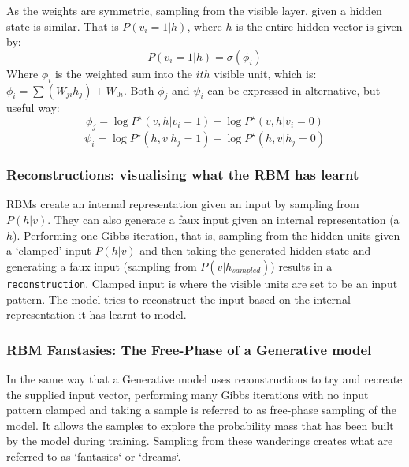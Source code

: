     As the weights are symmetric, sampling from the visible layer, given a hidden state is similar. That is $P(v_i = 1 | h)$, where $h$ is the entire hidden vector is given by:
    \begin{equation}\label{eq:Vis-Gibbs-Update}
     P(v_i = 1 | h) = \sigma(\phi_{i})
    \end{equation}
    Where $\phi_i$ is the weighted sum into the $ith$ visible unit, which is: $ \phi_i = \sum(W_{ji}h_{j}) + W_{0i} $. Both $\phi_j$ and $\psi_i$ can be expressed in alternative, but useful way:
    \begin{equation}
    \phi_j = \log P^\star(v,h | v_i = 1) - \log P^\star(v,h | v_i = 0)
    \end{equation}
    \begin{equation}\label{psi-gibbs-update-rbm}
    \psi_i = \log P^\star(h,v | h_j = 1) - \log P^\star(h,v | h_j = 0)
    \end{equation}



\subsubsection{Reconstructions: visualising what the RBM has learnt}\label{SS:RBM-Reconstructions}

RBMs create an internal representation given an input by sampling from $P(h|v)$. They can also generate a faux input given an internal representation (a $h$). Performing one Gibbs iteration, that is, sampling from the hidden units given a `clamped' input $ P(h|v) $ and then taking the generated hidden state and generating a faux input (sampling from $P(v|h_{sampled})$) results in a \texttt{reconstruction}. Clamped input is where the visible units are set to be an input pattern. The model tries to reconstruct the input based on the internal representation it has learnt to model.

\subsubsection{RBM Fanstasies: The Free-Phase of a Generative model}\label{S:Dreams}

In the same way that a Generative model uses reconstructions to try and recreate the supplied input vector, performing many Gibbs iterations with no input pattern clamped and taking a sample is referred to as free-phase sampling of the model. It allows the samples to explore the probability mass that has been built by the model during training. Sampling from these wanderings creates what are referred to as `fantasies` or `dreams`.
